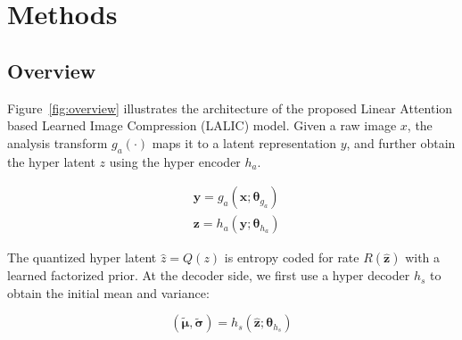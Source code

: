 
\section{Methods}

\subsection{Overview}

Figure~\ref{fig:overview} illustrates the architecture of the proposed Linear Attention based Learned Image Compression (LALIC) model. Given a raw image $x$, the analysis transform $g_a(\cdot)$ maps it to a latent representation $y$, and further obtain the hyper latent $z$ using the hyper encoder $h_a$.

\begin{equation}
\begin{aligned}
& \boldsymbol{y}=g_a\left(\boldsymbol{x} ; \boldsymbol{\theta}_{g_a}\right) \\
& \boldsymbol{z}=h_a\left(\boldsymbol{y} ; \boldsymbol{\theta}_{h_a}\right)
\end{aligned}
\end{equation}


The quantized hyper latent $\hat z = Q(z)$ is entropy coded for rate $R(\hat{\boldsymbol{z}})$ with a learned factorized prior.
At the decoder side, we first use a hyper decoder $h_s$ to obtain the initial mean and variance:

\begin{equation}
(\tilde{\boldsymbol{\mu}}, \tilde{\boldsymbol{\sigma}})=h_s\left(\hat{\boldsymbol{z}} ; \boldsymbol{\theta}_{h_s}\right)
\end{equation}


